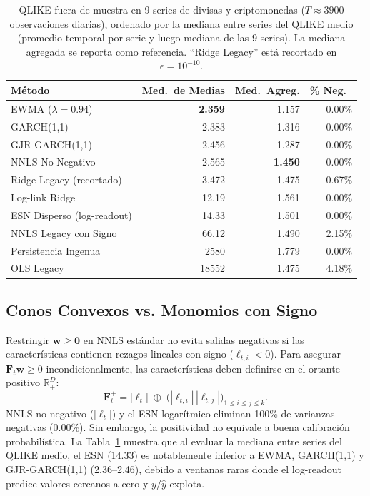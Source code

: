 \documentclass[aip,cha,reprint,amsmath,amssymb]{revtex4-2}
\begin{document}
\begin{table}[h]
\centering
\caption{QLIKE fuera de muestra en 9 series de divisas y criptomonedas ($T \approx 3900$ observaciones diarias), ordenado por la mediana entre series del QLIKE medio (promedio temporal por serie y luego mediana de las 9 series). La mediana agregada se reporta como referencia. ``Ridge Legacy'' está recortado en $\epsilon = 10^{-10}$.}
\label{tab:fx_qlike}
\begin{ruledtabular}
\scriptsize
\setlength{\tabcolsep}{1.5pt}
\begin{tabular}{lrrr}
Método & Med.\ de Medias & Med.\ Agreg. & \% Neg.\ \\
\midrule
EWMA ($\lambda=0.94$) & \textbf{2.359} & 1.157 & 0.00\% \\
GARCH(1,1) & 2.383 & 1.316 & 0.00\% \\
GJR-GARCH(1,1) & 2.456 & 1.287 & 0.00\% \\
NNLS No Negativo & 2.565 & \textbf{1.450} & 0.00\% \\
Ridge Legacy (recortado) & 3.472 & 1.475 & 0.67\% \\
Log-link Ridge & 12.19 & 1.561 & 0.00\% \\
ESN Disperso (log-readout) & 14.33 & 1.501 & 0.00\% \\
NNLS Legacy con Signo & 66.12 & 1.490 & 2.15\% \\
Persistencia Ingenua & 2580 & 1.779 & 0.00\% \\
OLS Legacy & 18552 & 1.475 & 4.18\% \\
\end{tabular}
\end{ruledtabular}
\end{table}

\subsection{Conos Convexos vs. Monomios con Signo}

Restringir $\mathbf{w} \ge \mathbf{0}$ en NNLS estándar \cite{lawson1974solving} no evita salidas negativas si las características contienen rezagos lineales con signo ($\ell_{t,i} < 0$). Para asegurar $\mathbf{F}_t \mathbf{w} \ge 0$ incondicionalmente, las características deben definirse en el ortante positivo $\mathbb{R}_+^D$:
\begin{equation}
\mathbf{F}_t^+ = |\bm{\ell}_t| \;\oplus\; \Big( |\ell_{t,i}|\,|\ell_{t,j}| \Big)_{1 \le i \le j \le k}.
\end{equation}
NNLS no negativo ($|\bm{\ell}_t|$) y el ESN logarítmico eliminan 100\% de varianzas negativas (0.00\%). Sin embargo, la positividad no equivale a buena calibración probabilística. La Tabla~\ref{tab:fx_qlike} muestra que al evaluar la mediana entre series del QLIKE medio, el ESN (14.33) es notablemente inferior a EWMA, GARCH(1,1) \cite{engle1982autoregressive,bollerslev1986generalized} y GJR-GARCH(1,1) \cite{glosten1993relation} (2.36--2.46), debido a ventanas raras donde el log-readout predice valores cercanos a cero y $y/\hat{y}$ explota.
\end{document}

